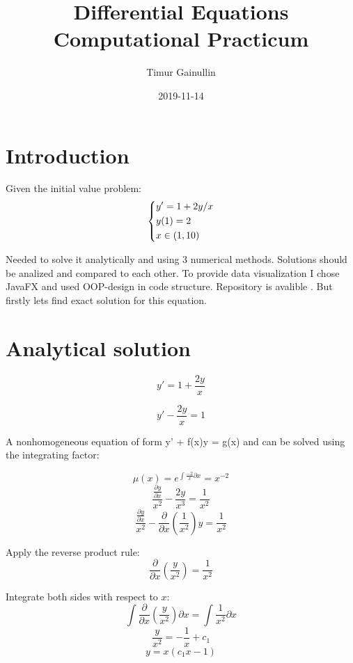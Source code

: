 \documentclass{article}
\title{Differential Equations Computational Practicum}
\date{2019-11-14}
\author{Timur Gainullin}
\begin{document}
	\maketitle %

	\newpage %



\section{Introduction}

Given the initial value problem:
\[
	\begin{dcases}
		y' = 1 + 2y / x\\
		y(1) = 2\\
		x \in (1, 10)
	\end{dcases}
\]

Needed to solve it analytically and using 3 numerical methods. Solutions should be analized and compared to each other. To provide data visualization I chose JavaFX and used OOP-design in code structure. Repository is avalible
\href{https://github.com/Tumypmyp/DE_Practicum}{}. But firstly lets find exact solution for this equation.


\section{Analytical solution}

	$$y' = 1 + \frac{2y}{x}$$

	$$y' - \frac{2y}{x} = 1$$

A nonhomogeneous equation of form y' + f(x)y = g(x) and can be
solved using the integrating factor:

	$$\mu(x) = e^{\int{\frac{-2}{x} \partial x}} = x^{-2}$$
	$$\frac{\frac{\partial y}{\partial x}}{x^2} - \frac{2y}{x^3} = \frac{1}{x^2}$$
	$$\frac{\frac{\partial y}{\partial x}}{x^2} - \frac{\partial}{\partial x}\left(\frac{1}{x^2}\right)y = \frac{1}{x^2}$$

Apply the reverse product rule:
	$$\frac{\partial}{\partial x}\left(\frac{y}{x^2}\right) = \frac{1}{x^2}$$

Integrate both sides with respect to $x$:
	$$\int{\frac{\partial}{\partial x}\left(\frac{y}{x^2}\right)}\partial x = \int{\frac{1}{x^2}}\partial x$$
	$$ \frac{y}{x^2} = -\frac{1}{x} + c_1$$
	$$y = x(c_1x - 1)$$
\end{document}
